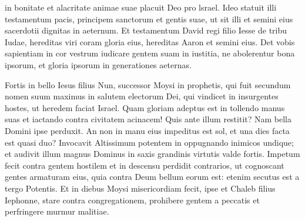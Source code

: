 \begin{biblechapter}
\begin{biblechapter}
\begin{biblechapter}
\begin{biblechapter}
\begin{biblechapter}
\begin{biblechapter}
\begin{biblechapter}
\begin{biblechapter}
\begin{biblechapter}
\begin{biblechapter}
\begin{biblechapter}
\begin{biblechapter}
\begin{biblechapter}
\begin{biblechapter}
\begin{biblechapter}
\begin{biblechapter}
\begin{biblechapter}
\begin{biblechapter}
\begin{biblechapter}
\begin{biblechapter}
\begin{biblechapter}
\begin{biblechapter}
\begin{biblechapter}
\begin{biblechapter}
\begin{biblechapter}
\begin{biblechapter}
\begin{biblechapter}
\begin{biblechapter}
\begin{biblechapter}
\begin{biblechapter}
\begin{biblechapter}
\begin{biblechapter}
\begin{biblechapter}
\begin{biblechapter}
\begin{biblechapter}
\begin{biblechapter}
\begin{biblechapter}
\begin{biblechapter}
\begin{biblechapter}
\begin{biblechapter}
\begin{biblechapter}
\begin{biblechapter}
\begin{biblechapter}
\begin{biblechapter}
\begin{biblechapter}
 in bonitate et alacritate animae suae placuit Deo pro lsrael.
 \verse Ideo statuit illi testamentum pacis,
 principem sanctorum et gentis suae,
 ut sit illi et semini eius
 sacerdotii dignitas in aeternum.
 \verse Et testamentum David regi filio Iesse de tribu Iudae,
 hereditas viri coram gloria eius,
 hereditas Aaron et semini eius.
 Det vobis sapientiam in cor vestrum
 iudicare gentem suam in iustitia,
 ne abolerentur bona ipsorum,
 et gloria ipsorum in generationes aeternas.
 
\begin{biblechapter}
\verse Fortis in bello Iesus filius Nun,
 successor Moysi in prophetis,
 qui fuit secundum nomen suum
 \verse maximus in salutem electorum Dei,
 qui vindicet in insurgentes hostes,
 ut heredem faciat Israel.
 \verse Quam gloriam adeptus est in tollendo manus suas
 et iactando contra civitatem acinacem!
 \verse Quis ante illum restitit?
 Nam bella Domini ipse perduxit.
 \verse An non in manu eius impeditus est sol,
 et una dies facta est quasi duo?
 \verse Invocavit Altissimum potentem
 in oppugnando inimicos undique;
 et audivit illum magnus Dominus
 in saxis grandinis virtutis valde fortis.
 \verse Impetum fecit contra gentem hostilem
 et in descensu perdidit contrarios,
 \verse ut cognoscant gentes armaturam eius,
 quia contra Deum bellum eorum est:
 etenim secutus est a tergo Potentis.
 \verse Et in diebus Moysi misericordiam fecit,
 ipse et Chaleb filius Iephonne,
 stare contra congregationem,
 prohibere gentem a peccatis
 et perfringere murmur malitiae.

\end{biblechapter}
\end{biblechapter}
\end{biblechapter}
\end{biblechapter}
\end{biblechapter}
\end{biblechapter}
\end{biblechapter}
\end{biblechapter}
\end{biblechapter}
\end{biblechapter}
\end{biblechapter}
\end{biblechapter}
\end{biblechapter}
\end{biblechapter}
\end{biblechapter}
\end{biblechapter}
\end{biblechapter}
\end{biblechapter}
\end{biblechapter}
\end{biblechapter}
\end{biblechapter}
\end{biblechapter}
\end{biblechapter}
\end{biblechapter}
\end{biblechapter}
\end{biblechapter}
\end{biblechapter}
\end{biblechapter}
\end{biblechapter}
\end{biblechapter}
\end{biblechapter}
\end{biblechapter}
\end{biblechapter}
\end{biblechapter}
\end{biblechapter}
\end{biblechapter}
\end{biblechapter}
\end{biblechapter}
\end{biblechapter}
\end{biblechapter}
\end{biblechapter}
\end{biblechapter}
\end{biblechapter}
\end{biblechapter}
\end{biblechapter}
\end{biblechapter}

